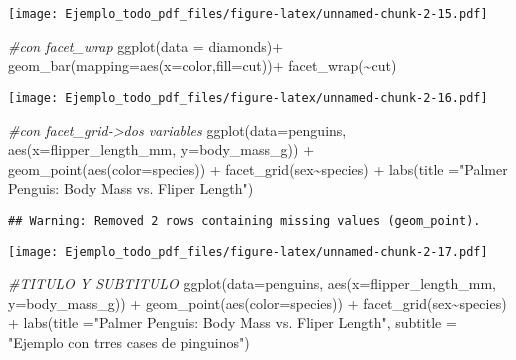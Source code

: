 \documentclass[
]{article}
\newenvironment{Shaded}{\begin{snugshade}}{\end{snugshade}}
\newcommand{\AttributeTok}[1]{\textcolor[rgb]{0.77,0.63,0.00}{#1}}
\newcommand{\CommentTok}[1]{\textcolor[rgb]{0.56,0.35,0.01}{\textit{#1}}}
\newcommand{\FunctionTok}[1]{\textcolor[rgb]{0.00,0.00,0.00}{#1}}
\newcommand{\NormalTok}[1]{#1}
\newcommand{\SpecialCharTok}[1]{\textcolor[rgb]{0.00,0.00,0.00}{#1}}
\newcommand{\StringTok}[1]{\textcolor[rgb]{0.31,0.60,0.02}{#1}}
\begin{document}
\texttt{[image: Ejemplo\_todo\_pdf\_files/figure-latex/unnamed-chunk-2-15.pdf]}

\begin{Shaded}
\begin{Highlighting}[]
\CommentTok{\#con facet\_wrap}
\FunctionTok{ggplot}\NormalTok{(}\AttributeTok{data =}\NormalTok{ diamonds)}\SpecialCharTok{+}
  \FunctionTok{geom\_bar}\NormalTok{(}\AttributeTok{mapping=}\FunctionTok{aes}\NormalTok{(}\AttributeTok{x=}\NormalTok{color,}\AttributeTok{fill=}\NormalTok{cut))}\SpecialCharTok{+}
  \FunctionTok{facet\_wrap}\NormalTok{(}\SpecialCharTok{\textasciitilde{}}\NormalTok{cut)}
\end{Highlighting}
\end{Shaded}

\texttt{[image: Ejemplo\_todo\_pdf\_files/figure-latex/unnamed-chunk-2-16.pdf]}

\begin{Shaded}
\begin{Highlighting}[]
\CommentTok{\#con facet\_grid{-}\textgreater{}dos variables}
\FunctionTok{ggplot}\NormalTok{(}\AttributeTok{data=}\NormalTok{penguins, }\FunctionTok{aes}\NormalTok{(}\AttributeTok{x=}\NormalTok{flipper\_length\_mm, }\AttributeTok{y=}\NormalTok{body\_mass\_g)) }\SpecialCharTok{+}
  \FunctionTok{geom\_point}\NormalTok{(}\FunctionTok{aes}\NormalTok{(}\AttributeTok{color=}\NormalTok{species)) }\SpecialCharTok{+} \FunctionTok{facet\_grid}\NormalTok{(sex}\SpecialCharTok{\textasciitilde{}}\NormalTok{species) }\SpecialCharTok{+}
  \FunctionTok{labs}\NormalTok{(}\AttributeTok{title =}\StringTok{"Palmer Penguis: Body Mass vs. Fliper Length"}\NormalTok{)}
\end{Highlighting}
\end{Shaded}

\begin{verbatim}
## Warning: Removed 2 rows containing missing values (geom_point).
\end{verbatim}

\texttt{[image: Ejemplo\_todo\_pdf\_files/figure-latex/unnamed-chunk-2-17.pdf]}

\begin{Shaded}
\begin{Highlighting}[]
\CommentTok{\#TITULO Y SUBTITULO}
\FunctionTok{ggplot}\NormalTok{(}\AttributeTok{data=}\NormalTok{penguins, }\FunctionTok{aes}\NormalTok{(}\AttributeTok{x=}\NormalTok{flipper\_length\_mm, }\AttributeTok{y=}\NormalTok{body\_mass\_g)) }\SpecialCharTok{+}
  \FunctionTok{geom\_point}\NormalTok{(}\FunctionTok{aes}\NormalTok{(}\AttributeTok{color=}\NormalTok{species)) }\SpecialCharTok{+} \FunctionTok{facet\_grid}\NormalTok{(sex}\SpecialCharTok{\textasciitilde{}}\NormalTok{species) }\SpecialCharTok{+}
  \FunctionTok{labs}\NormalTok{(}\AttributeTok{title =}\StringTok{"Palmer Penguis: Body Mass vs. Fliper Length"}\NormalTok{, }\AttributeTok{subtitle =} \StringTok{"Ejemplo con trres cases de pinguinos"}\NormalTok{)}
\end{Highlighting}
\end{Shaded}
\end{document}
